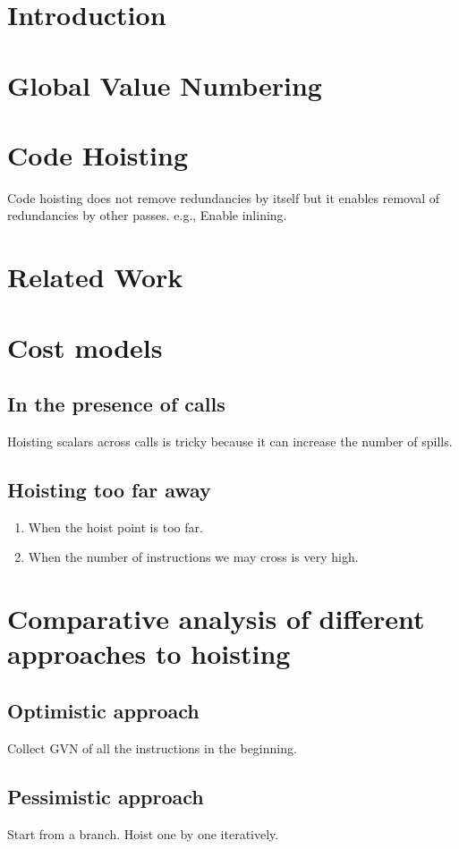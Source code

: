 \section{Introduction}

\section{Global Value Numbering}
\section{Code Hoisting}
Code hoisting does not remove redundancies by itself but it enables
removal of redundancies by other passes.  e.g., Enable inlining.
\section{Related Work}




\section{Cost models}
\subsection{In the presence of calls}
Hoisting scalars across calls is tricky because it can increase the
number of spills.

\subsection{Hoisting too far away}
\begin{enumerate}
\item When the hoist point is too far.
\item When the number of instructions we may cross is very high.
\end{enumerate}

\section{Comparative analysis of different approaches to hoisting}
\subsection{Optimistic approach}
Collect GVN of all the instructions in the beginning.
\subsection{Pessimistic approach}
Start from a branch. Hoist one by one iteratively.
